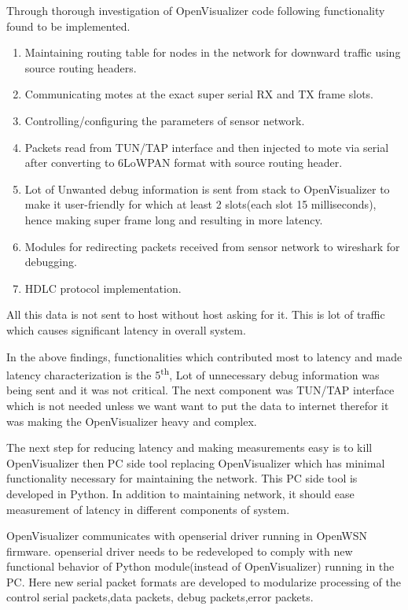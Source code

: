 Through thorough investigation of OpenVisualizer code following functionality found to be implemented.

\begin{enumerate}
	\item Maintaining routing table for nodes in the network for downward traffic using source routing headers.
	\item Communicating motes at the exact super serial RX and TX frame slots.
	\item Controlling/configuring the parameters of sensor network.
	\item Packets read from TUN/TAP interface and then injected to mote via serial after converting to 6LoWPAN format with source routing header.
	\item Lot of Unwanted debug information is sent from stack to OpenVisualizer to make it user-friendly for which at least 2 slots(each slot 15 milliseconds), hence making super frame long and resulting in more latency.
	\item Modules for redirecting packets received from sensor network to wireshark for debugging.
	\item HDLC protocol implementation.
\end{enumerate}

All this data is not sent to host without host asking for it. This is lot of traffic which causes significant latency in overall system.

In the above findings, functionalities which contributed most to latency and made latency characterization is the 5\textsuperscript{th}, Lot of unnecessary debug information was being sent and it was not critical. The next component was TUN/TAP interface which is not needed unless we want want to put the data to internet therefor it was making the OpenVisualizer heavy and complex.

The next step for reducing latency and making measurements easy is to kill OpenVisualizer then PC side tool replacing OpenVisualizer which has minimal functionality necessary for maintaining the network. This PC side tool is developed in Python. In addition to maintaining network, it should ease measurement of latency in different components of system.

OpenVisualizer communicates with openserial driver running in OpenWSN firmware. openserial driver needs to be redeveloped to comply with new functional behavior of Python module(instead of OpenVisualizer) running in the PC. Here new serial packet formats are developed to modularize processing of the control serial packets,data packets, debug packets,error packets.

